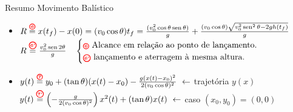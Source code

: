 \documentclass{beamer}
\begin{document}
\begin{frame}{Resumo Movimento Balístico}
\begin{itemize}
			\item $R \overset{\circled{6}}{=} x(t_f) - x(0)= (v_0\cos\theta)t_f = \frac{(v_0^2 \cos\theta \operatorname{sen}\theta)}{g} + \frac{(v_0 \cos\theta)\sqrt{v_0^2\operatorname{sen}^2\theta - 2gh(t_f)}}{g}$ \\
			$R \overset{\circled{6'}}{=} \frac{v_0^2 \operatorname{sen} 2\theta}{g} \quad 
			\begin{cases} 
				\text{\circled{6} Alcance em relação ao ponto de lançamento.} \\ 
				\text{\circled{6'} lançamento e aterragem à mesma altura.} 
			\end{cases}$ \\
			
			
			\item $y(t) \overset{\circled{7}}{=} y_0 + (\tan\theta)(x(t)-x_0) - \frac{g(x(t)-x_0)^2}{2(v_0\cos\theta)^2} \ \leftarrow$ trajetória $y(x)$ \\
			$y(t) \overset{\circled{7'}}{=} \left(-\frac{g}{2(v_0\cos\theta)^2}\right)x^2(t) + (\tan\theta)x(t) \ \leftarrow$ caso $(x_0, y_0) = (0,0)$
		\end{itemize}
		
	

	\end{frame}		
\end{document}
